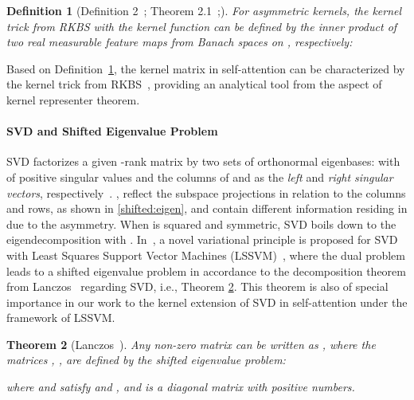 \documentclass{article}
\newtheorem{theorem}{Theorem}[section]
\newtheorem{definition}[theorem]{Definition}
\begin{document}
	
	\begin{definition}
		[Definition 2~\cite{wright2021transformers}; Theorem 2.1~\cite{lin2022reproducing};\cite{georgiev2013construction}]
		\label{def:asym:kernel}
		For asymmetric kernels, the kernel trick from RKBS with the kernel function  can be defined by the inner product of two real measurable feature maps from Banach spaces  on , respectively:
		
	\end{definition}
	Based on Definition~\ref{def:asym:kernel}, the kernel matrix in self-attention can be characterized by the kernel trick from RKBS~\cite{wright2021transformers}, providing an analytical tool from the aspect of kernel representer theorem.
	
	\paragraph{SVD and Shifted Eigenvalue Problem}
	SVD factorizes a given -rank matrix  by two sets of orthonormal eigenbases:   with   of positive singular values and the columns of  and  as the \emph{left} and \emph{right singular vectors}, respectively~\cite{strang2006linear}. 
	,  reflect the subspace projections in relation to the columns and rows, as shown in  \eqref{shifted:eigen}, and contain different information residing in  due to the asymmetry. 
	When  is squared and symmetric, SVD boils down to the eigendecomposition with .  
	In~\cite{suykens2016svd}, a novel variational principle is proposed for SVD with Least Squares Support Vector Machines (LSSVM)~\cite{suykens2002least}, where the dual problem leads to a shifted eigenvalue problem in accordance to the decomposition theorem from Lanczos~\cite{lanczos1958linear} regarding SVD, i.e., Theorem \ref{theorem:lanczos}. This theorem is also of special importance in our work to the kernel extension of SVD  in self-attention under the framework of LSSVM.
	
	\begin{theorem}[Lanczos~\cite{lanczos1958linear}]\label{theorem:lanczos}
		Any non-zero matrix {} can be written as {}, where the matrices , ,  are defined by the shifted eigenvalue problem:
		
		where   and   satisfy  and , and  is a diagonal matrix with positive numbers.
	\end{theorem}
	
	
	
	
	
	
	
	
\end{document}
